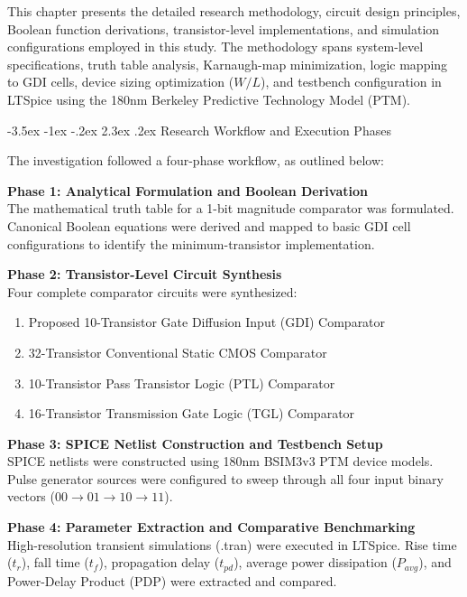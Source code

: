 \documentclass[12pt,a4paper,oneside]{report}
\makeatletter
\renewcommand\section{\@startsection {section}{1}{\z@}%
                                   {-3.5ex \@plus -1ex \@minus -.2ex}%
                                   {2.3ex \@plus.2ex}%
                                   {\normalfont\normalsize\bfseries}}
\makeatother
\begin{document}
This chapter presents the detailed research methodology, circuit design principles, Boolean function derivations, transistor-level implementations, and simulation configurations employed in this study. The methodology spans system-level specifications, truth table analysis, Karnaugh-map minimization, logic mapping to GDI cells, device sizing optimization ($W/L$), and testbench configuration in LTSpice using the 180nm Berkeley Predictive Technology Model (PTM).

\section{Research Workflow and Execution Phases}

The investigation followed a four-phase workflow, as outlined below:

\noindent\textbf{Phase 1: Analytical Formulation and Boolean Derivation}\\
The mathematical truth table for a 1-bit magnitude comparator was formulated. Canonical Boolean equations were derived and mapped to basic GDI cell configurations to identify the minimum-transistor implementation.

\noindent\textbf{Phase 2: Transistor-Level Circuit Synthesis}\\
Four complete comparator circuits were synthesized:
\begin{enumerate}
\item Proposed 10-Transistor Gate Diffusion Input (GDI) Comparator
\item 32-Transistor Conventional Static CMOS Comparator
\item 10-Transistor Pass Transistor Logic (PTL) Comparator
\item 16-Transistor Transmission Gate Logic (TGL) Comparator
\end{enumerate}

\noindent\textbf{Phase 3: SPICE Netlist Construction and Testbench Setup}\\
SPICE netlists were constructed using 180nm BSIM3v3 PTM device models. Pulse generator sources were configured to sweep through all four input binary vectors ($00 \rightarrow 01 \rightarrow 10 \rightarrow 11$).

\noindent\textbf{Phase 4: Parameter Extraction and Comparative Benchmarking}\\
High-resolution transient simulations (.tran) were executed in LTSpice. Rise time ($t_r$), fall time ($t_f$), propagation delay ($t_{pd}$), average power dissipation ($P_{avg}$), and Power-Delay Product (PDP) were extracted and compared.
\end{document}
